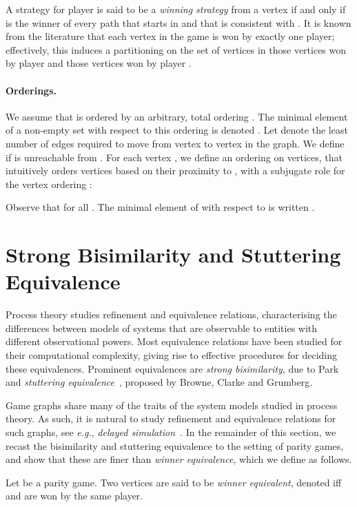 \documentclass[a4paper]{llncs}
\newcommand{\eg}{\textit{e.g.}\xspace}
\begin{document}
A strategy  for player  is said
to be a \emph{winning strategy} from a vertex  if and only if 
is the winner of every path that starts in  and that is consistent
with . It is known from the literature that each vertex in the game
is won by exactly one player; effectively, this induces a partitioning
on the set of vertices  in those vertices won by player  and
those vertices won by player . 

\paragraph{Orderings.} We assume that  is ordered by an arbitrary,
total ordering . The minimal element of a non-empty
set  with respect to this ordering is denoted
.  Let  denote the least number of edges
required to move from vertex  to vertex  in the graph. We define
 if  is unreachable from . For each vertex ,
we define an ordering  on vertices,
that intuitively orders vertices based on their proximity to , with a
subjugate role for the vertex ordering :

Observe that  for all . The minimal
element of  with respect to  is written
.


\section{Strong Bisimilarity and Stuttering Equivalence}
\label{sec:equivalences}

Process theory studies refinement and equivalence
relations, characterising the differences between models of systems that
are observable to entities with different observational powers. Most equivalence
relations have been studied for their computational complexity, giving
rise to effective procedures for deciding these equivalences.  Prominent
equivalences are \emph{strong bisimilarity}, due to Park~\cite{Par:81}
and \emph{stuttering equivalence}~\cite{BCG:88}, proposed by Browne,
Clarke and Grumberg.

Game graphs share many of the traits of the system models studied
in process theory. As such, it is natural to study refinement
and equivalence relations for such graphs, see \eg, \emph{delayed
simulation}~\cite{FW:06}. In the remainder of this section, we recast the
bisimilarity and stuttering equivalence to the setting
of parity games, and show that these are finer than \emph{winner equivalence},
which we define as follows.

\begin{definition} Let  be
a parity game. Two vertices  are said to
be \emph{winner equivalent}, denoted  iff
 and  are won by the same player.
\end{definition}
\end{document}

